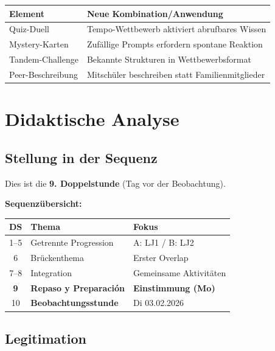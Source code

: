 \documentclass[11pt,a4paper]{article}
\begin{document}
\begin{tabular}{|l|p{9cm}|}
\hline
\textbf{Element} & \textbf{Neue Kombination/Anwendung} \\
\hline
Quiz-Duell & Tempo-Wettbewerb aktiviert abrufbares Wissen \\
\hline
Mystery-Karten & Zufällige Prompts erfordern spontane Reaktion \\
\hline
Tandem-Challenge & Bekannte Strukturen in Wettbewerbsformat \\
\hline
Peer-Beschreibung & Mitschüler beschreiben statt Familienmitglieder \\
\hline
\end{tabular}

\section{Didaktische Analyse}

\subsection{Stellung in der Sequenz}

Dies ist die \textbf{9. Doppelstunde} (Tag vor der Beobachtung).

\vspace{0.5em}
\textbf{Sequenzübersicht:}
\begin{center}
\begin{tabular}{|c|l|l|}
\hline
\textbf{DS} & \textbf{Thema} & \textbf{Fokus} \\
\hline
1--5 & Getrennte Progression & A: LJ1 / B: LJ2 \\
\hline
6 & Brückenthema & Erster Overlap \\
\hline
7--8 & Integration & Gemeinsame Aktivitäten \\
\hline
\rowcolor{lightgray} \textbf{9} & \textbf{Repaso y Preparación} & \textbf{Einstimmung (Mo)} \\
\hline
10 & \textbf{Beobachtungsstunde} & Di 03.02.2026 \\
\hline
\end{tabular}
\end{center}

\subsection{Legitimation}
\end{document}
